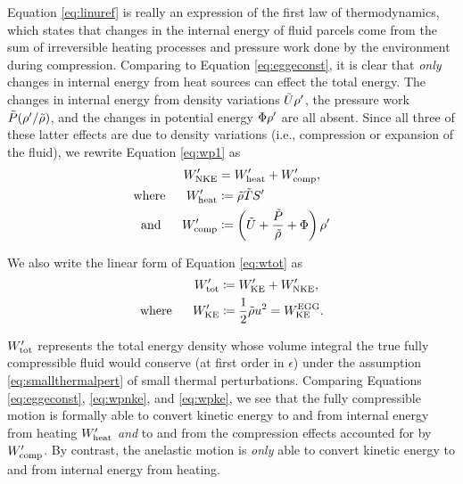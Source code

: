 \documentclass[12pt]{article}
\newcommand{\wptot}{W^\prime_{\rm tot}}
\newcommand{\wpke}{W^\prime_{\rm KE}}
\newcommand{\wpnke}{W^\prime_{\rm NKE}}
\newcommand{\wpheat}{W^\prime_{\rm heat}}
\newcommand{\wpcomp}{W^\prime_{\rm comp}}
\newcommand{\eggwke}{W^{\rm EGG}_{\rm KE}}
\begin{document}
Equation \eqref{eq:linuref} is really an expression of the first law of thermodynamics, which states that changes in the internal energy of fluid parcels come from the sum of irreversible heating processes and pressure work done by the environment during compression. Comparing to Equation \eqref{eq:eggeconst}, it is clear that \textit{only} changes in internal energy from heat sources can effect the total energy. The changes in internal energy from density variations $\tilde{U}{\rho^\prime}$, the pressure work $\tilde{P}({\rho^\prime}/\tilde{\rho})$, and the changes in potential energy $\Phi{\rho^\prime}$ are all absent. Since all three of these latter effects are due to density variations (i.e., compression or expansion of the fluid), we rewrite Equation \eqref{eq:wp1} as
\begin{subequations}\label{eq:wpnke}
	\begin{align}
		\wpnke &= \wpheat + \wpcomp,\\
		\where \wpheat&\define \rhotilde\tmptilde \entrprime\\
		\andd \wpcomp &\define \left(\intetilde+\frac{\prstilde}{\rhotilde}+\Phi\right)\rhoprime
	\end{align}
\end{subequations}

We also write the linear form of Equation \eqref{eq:wtot} as
\begin{subequations}\label{eq:wpke}
	\begin{align}
		\wptot &\define \wpke + \wpnke,\\
		\where \wpke &\define \frac{1}{2}\rhotilde u^2 = \eggwke.
	\end{align}
\end{subequations}

$\wptot$ represents the total energy density whose volume integral the true fully compressible fluid would conserve (at first order in $\epsilon$) under the assumption \eqref{eq:smallthermalpert} of small thermal perturbations. Comparing Equations \eqref{eq:eggeconst}, \eqref{eq:wpnke}, and \eqref{eq:wpke}, we see that the fully compressible motion is formally able to convert kinetic energy to and from internal energy from heating $\wpheat$ \textit{and} to and from the compression effects accounted for by $\wpcomp$. By contrast, the anelastic motion is \textit{only} able to convert kinetic energy to and from internal energy from heating.
\end{document}
